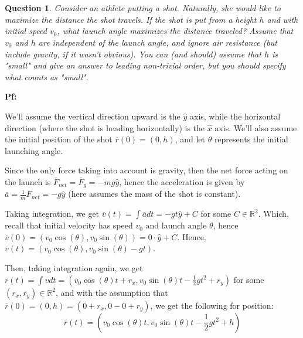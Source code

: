 \documentclass{article}
\newtheorem{question}{Question}
\newcommand{\RR}{\mathbb{R}}
\newcommand{\br}{\overline{r}}
\newcommand{\bv}{\overline{v}}
\newcommand{\ba}{\overline{a}}
\newcommand{\bF}{\overline{F}}
\begin{document}
\section{}%
\begin{question}\label{q2}
    Consider an athlete putting a shot. Naturally, she would like to maximize the distance the shot travels. If the shot is put from a height $h$ and with initial speed $v_0$, what launch angle maximizes the distance traveled? Assume that $v_0$ and $h$ are independent of the launch angle, and ignore air resistance (but include gravity, if it wasn't obvious). You can (and should) assume that $h$ is "small" and give an answer to leading non-trivial order, but you should specify what counts as "small".
\end{question}

\textbf{Pf:}

We'll assume the vertical direction upward is the $\hat{y}$ axis, while the horizontal direction (where the shot is heading horizontally) is the $\hat{x}$ axis. We'll also assume the initial position of the shot $\br(0) = (0,h)$, and let $\theta$ represents the initial launching angle.

Since the only force taking into account is gravity, then the net force acting on the launch is $\bF_{net} = \bF_g = -mg\hat{y}$, hence the acceleration is given by $\ba = \frac{1}{m}\bF_{net} = -g\hat{y}$ (here assumes the mass of the shot is constant).

Taking integration, we get $\bv(t) = \int \ba dt = -gt\hat{y}+\overline{C}$ for some $\overline{C} \in \RR^2$. Which, recall that initial velocity has speed $v_0$ and launch angle $\theta$, hence $\bv(0) = (v_0\cos(\theta),v_0\sin(\theta)) = 0\cdot \hat{y}+\overline{C}$. Hence, $\bv(t) = (v_0\cos(\theta), v_0\sin(\theta)-gt)$.

Then, taking integration again, we get $\br(t) = \int \bv dt = (v_0\cos(\theta)t + r_x, v_0\sin(\theta)t - \frac{1}{2}gt^2 + r_y)$ for some $(r_x,r_y)\in \RR^2$, and with the assumption that $\br(0) = (0,h) = (0+r_x, 0-0+r_y)$, we get the following for position:
$$\br(t) = \left(v_0\cos(\theta)t, v_0\sin(\theta)t-\frac{1}{2}gt^2+h\right)$$

\hfil
\end{document}
